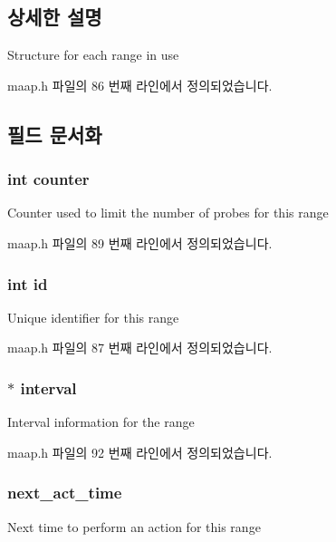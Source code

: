 \subsection{상세한 설명}
Structure for each range in use 

maap.\+h 파일의 86 번째 라인에서 정의되었습니다.



\subsection{필드 문서화}
\subsubsection[{\texorpdfstring{counter}{counter}}]{\setlength{\rightskip}{0pt plus 5cm}int counter}\hypertarget{structrange_a617a47c70795bcff659815ad0efd2266}{}\label{structrange_a617a47c70795bcff659815ad0efd2266}
Counter used to limit the number of probes for this range 

maap.\+h 파일의 89 번째 라인에서 정의되었습니다.

\subsubsection[{\texorpdfstring{id}{id}}]{\setlength{\rightskip}{0pt plus 5cm}int id}\hypertarget{structrange_a7441ef0865bcb3db9b8064dd7375c1ea}{}\label{structrange_a7441ef0865bcb3db9b8064dd7375c1ea}
Unique identifier for this range 

maap.\+h 파일의 87 번째 라인에서 정의되었습니다.

\subsubsection[{\texorpdfstring{interval}{interval}}]{$\ast$ interval}\hypertarget{structrange_a07955c04c790953cbbcc9305fda01a0a}{}\label{structrange_a07955c04c790953cbbcc9305fda01a0a}
Interval information for the range 

maap.\+h 파일의 92 번째 라인에서 정의되었습니다.

\subsubsection[{\texorpdfstring{next\+\_\+act\+\_\+time}{next_act_time}}]{ next\+\_\+act\+\_\+time}\hypertarget{structrange_a612425de4bd924a67f8e553419d979ba}{}\label{structrange_a612425de4bd924a67f8e553419d979ba}
Next time to perform an action for this range 

